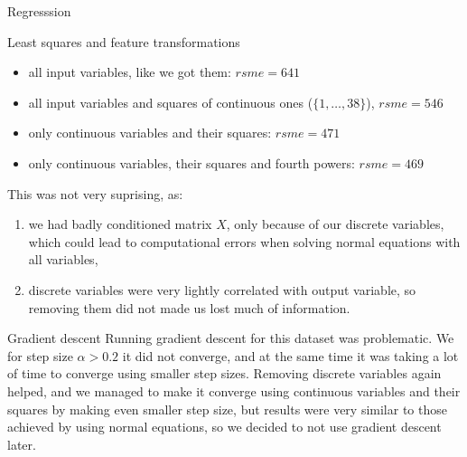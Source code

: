\documentclass{article}
\begin{document}
\begin{section}{Regresssion}
\begin{subsection}{Least squares and feature transformations}
\begin{itemize}
\item all input variables, like we got them: $rsme=641$
\item all input variables and squares of continuous ones ($\{1, \ldots, 38\}$), $rsme = 546$
\item only continuous variables and their squares: $rsme = 471$
\item only continuous variables, their squares and fourth powers: $rsme = 469$
\end{itemize}
This was not very suprising, as:
\begin{enumerate}
\item we had badly conditioned matrix $X$, only because of our discrete variables, which could lead to computational errors when solving normal equations with all variables,
\item discrete variables were very lightly correlated with output variable, so removing them did not made us lost much of information.
\end{enumerate}
\end{subsection}
\begin{subsection}{Gradient descent}
Running gradient descent for this dataset was problematic. We for step size $\alpha > 0.2$ it did not converge, and at the same time it was taking a lot of time to converge using smaller step sizes. Removing discrete variables again helped, and we managed to make it converge using continuous variables and their squares by making even smaller step size, but results were very similar to those achieved by using normal equations, so we decided to not use gradient descent later.


\end{subsection}
\end{section}
\end{document}
